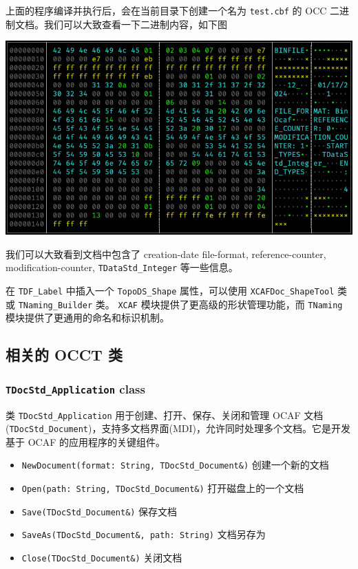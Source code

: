 \documentclass[11pt]{article}
\begin{document}
上面的程序编译并执行后，会在当前目录下创建一个名为 \texttt{test.cbf} 的 OCC 二进制文档。我们可以大致查看一下二进制内容，如下图

\begin{center}
\includegraphics[width=.9\linewidth]{./img/binocaf-binary-content.png}
\end{center}

我们可以大致看到文档中包含了 creation-date file-format, reference-counter, modification-counter, \texttt{TDataStd\_Integer} 等一些信息。

在 \texttt{TDF\_Label} 中插入一个 \texttt{TopoDS\_Shape} 属性，可以使用 \texttt{XCAFDoc\_ShapeTool} 类或 \texttt{TNaming\_Builder} 类。 \texttt{XCAF} 模块提供了更高级的形状管理功能，而 \texttt{TNaming} 模块提供了更通用的命名和标识机制。
\subsection{相关的 OCCT 类}
\label{sec:orge9d0cc8}

\subsubsection{\texttt{TDocStd\_Application} class}
\label{sec:orgbe10c42}

类 \texttt{TDocStd\_Application} 用于创建、打开、保存、关闭和管理 OCAF 文档(\texttt{TDocStd\_Document})，支持多文档界面(MDI)，允许同时处理多个文档。它是开发基于 OCAF 的应用程序的关键组件。

\begin{itemize}
\item \texttt{NewDocument(format: String, TDocStd\_Document\&)} 创建一个新的文档
\item \texttt{Open(path: String, TDocStd\_Document\&)} 打开磁盘上的一个文档
\item \texttt{Save(TDocStd\_Document\&)} 保存文档
\item \texttt{SaveAs(TDocStd\_Document\&, path: String)} 文档另存为
\item \texttt{Close(TDocStd\_Document\&)} 关闭文档
\end{itemize}
\end{document}
